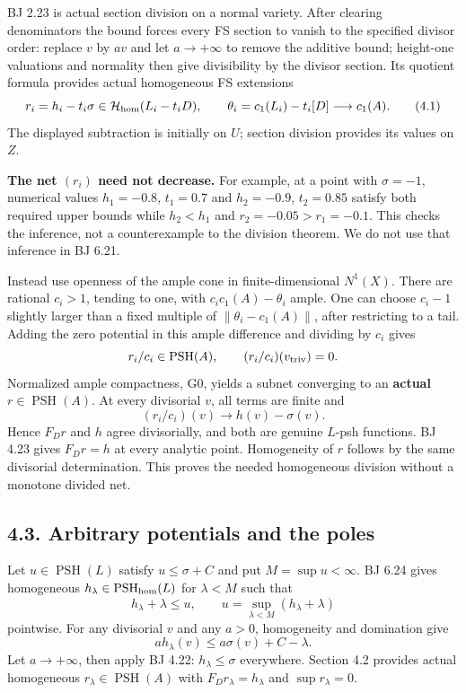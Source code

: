 \documentclass[
  10pt,
]{article}
\begin{document}
BJ 2.23 is actual section division on a normal variety. After clearing
denominators the bound forces every FS section to vanish to the
specified divisor order: replace \(v\) by \(av\) and let \(a\to+\infty\)
to remove the additive bound; height-one valuations and normality then
give divisibility by the divisor section. Its quotient formula provides
actual homogeneous FS extensions \[
 r_i=h_i-t_i\sigma\in\mathcal H_{\rm hom}(L_i-t_iD),\qquad
 \theta_i=c_1(L_i)-t_i[D]\longrightarrow c_1(A).               \tag{4.1}
\] The displayed subtraction is initially on \(U\); section division
provides its values on \(Z\).

\textbf{The net \((r_i)\) need not decrease.} For example, at a point
with \(\sigma=-1\), numerical values \(h_1=-0.8\), \(t_1=0.7\) and
\(h_2=-0.9\), \(t_2=0.85\) satisfy both required upper bounds while
\(h_2<h_1\) and \(r_2=-0.05>r_1=-0.1\). This checks the inference, not a
counterexample to the division theorem. We do not use that inference in
BJ 6.21.

Instead use openness of the ample cone in finite-dimensional \(N^1(X)\).
There are rational \(c_i>1\), tending to one, with
\(c_i c_1(A)-\theta_i\) ample. One can choose \(c_i-1\) slightly larger
than a fixed multiple of \(\|\theta_i-c_1(A)\|\), after restricting to a
tail. Adding the zero potential in this ample difference and dividing by
\(c_i\) gives \[
             r_i/c_i\in\operatorname{PSH}(A),\qquad
                       (r_i/c_i)(v_{\rm triv})=0.
\] Normalized ample compactness, G0, yields a subnet converging to an
\textbf{actual} \(r\in\operatorname{PSH}(A)\). At every divisorial
\(v\), all terms are finite and \[
             (r_i/c_i)(v)\longrightarrow h(v)-\sigma(v).
\] Hence \(F_Dr\) and \(h\) agree divisorially, and both are genuine
\(L\)-psh functions. BJ 4.23 gives \(F_Dr=h\) at every analytic point.
Homogeneity of \(r\) follows by the same divisorial determination. This
proves the needed homogeneous division without a monotone divided net.

\subsection{4.3. Arbitrary potentials and the
poles}\label{arbitrary-potentials-and-the-poles}

Let \(u\in\operatorname{PSH}(L)\) satisfy \(u\leq\sigma+C\) and put
\(M=\sup u<\infty\). BJ 6.24 gives homogeneous
\(h_\lambda\in\operatorname{PSH}_{\rm hom}(L)\) for \(\lambda<M\) such
that \[
 h_\lambda+\lambda\leq u,\qquad
              u=\sup_{\lambda<M}(h_\lambda+\lambda)             \tag{4.2}
\] pointwise. For any divisorial \(v\) and any \(a>0\), homogeneity and
domination give \[
 a h_\lambda(v)\leq a\sigma(v)+C-\lambda.
\] Let \(a\to+\infty\), then apply BJ 4.22: \(h_\lambda\leq\sigma\)
everywhere. Section 4.2 provides actual homogeneous
\(r_\lambda\in\operatorname{PSH}(A)\) with \(F_Dr_\lambda=h_\lambda\)
and \(\sup r_\lambda=0\).
\end{document}
